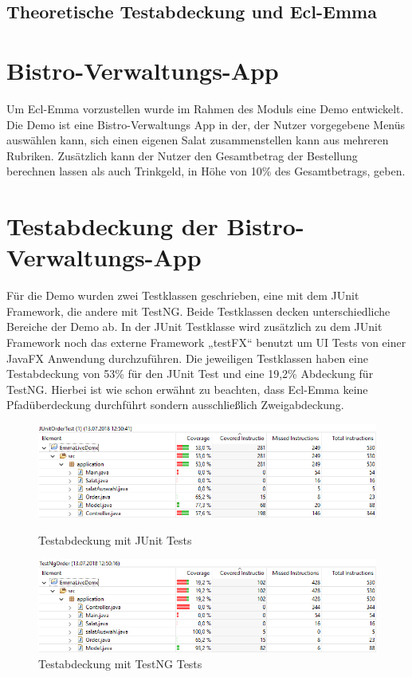 \documentclass[a4paper]{article}
\begin{document}
\subsection{Theoretische Testabdeckung und Ecl-Emma}
\section{Bistro-Verwaltungs-App}
Um Ecl-Emma vorzustellen wurde im Rahmen des Moduls eine Demo entwickelt. 
Die Demo ist eine Bistro-Verwaltungs App in der, der Nutzer vorgegebene Menüs auswählen kann, sich einen eigenen Salat zusammenstellen kann aus mehreren Rubriken. Zusätzlich kann der Nutzer den Gesamtbetrag der Bestellung berechnen lassen als auch Trinkgeld, in Höhe von 10\% des Gesamtbetrags, geben.
\section{Testabdeckung der Bistro-Verwaltungs-App}
Für die Demo wurden zwei Testklassen geschrieben, eine mit dem JUnit Framework, die andere mit TestNG. Beide Testklassen decken unterschiedliche Bereiche der Demo ab. 
In der JUnit Testklasse wird zusätzlich zu dem JUnit Framework noch das externe Framework „testFX“ benutzt um UI Tests von einer JavaFX Anwendung durchzuführen.
Die jeweiligen Testklassen haben eine Testabdeckung von 53\% für den JUnit Test und eine 19,2\% Abdeckung für TestNG. 
Hierbei ist wie schon erwähnt zu beachten, dass Ecl-Emma keine Pfadüberdeckung durchführt sondern ausschließlich Zweigabdeckung. 
\begin{figure}[h]
\includegraphics[scale=0.60 ]{Testabdeckung_JUnit.png}
\caption{Testabdeckung mit JUnit Tests}
\includegraphics[scale=0.60]{Testabdeckung_TestNG.png}
\caption{Testabdeckung mit TestNG Tests}
\centering
\end{figure}
\end{document}
